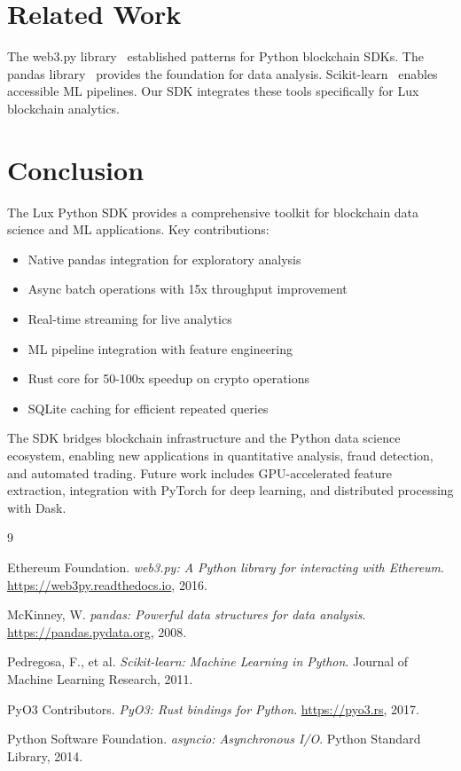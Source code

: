 \documentclass[11pt,twocolumn]{article}
\begin{document}
\section{Related Work}

The web3.py library~\cite{web3py} established patterns for Python blockchain SDKs. The pandas library~\cite{pandas} provides the foundation for data analysis. Scikit-learn~\cite{sklearn} enables accessible ML pipelines. Our SDK integrates these tools specifically for Lux blockchain analytics.

\section{Conclusion}

The Lux Python SDK provides a comprehensive toolkit for blockchain data science and ML applications. Key contributions:

\begin{itemize}
    \item Native pandas integration for exploratory analysis
    \item Async batch operations with 15x throughput improvement
    \item Real-time streaming for live analytics
    \item ML pipeline integration with feature engineering
    \item Rust core for 50-100x speedup on crypto operations
    \item SQLite caching for efficient repeated queries
\end{itemize}

The SDK bridges blockchain infrastructure and the Python data science ecosystem, enabling new applications in quantitative analysis, fraud detection, and automated trading. Future work includes GPU-accelerated feature extraction, integration with PyTorch for deep learning, and distributed processing with Dask.

\begin{thebibliography}{9}

Ethereum Foundation.
\textit{web3.py: A Python library for interacting with Ethereum}.
\url{https://web3py.readthedocs.io}, 2016.

McKinney, W.
\textit{pandas: Powerful data structures for data analysis}.
\url{https://pandas.pydata.org}, 2008.

Pedregosa, F., et al.
\textit{Scikit-learn: Machine Learning in Python}.
Journal of Machine Learning Research, 2011.

PyO3 Contributors.
\textit{PyO3: Rust bindings for Python}.
\url{https://pyo3.rs}, 2017.

Python Software Foundation.
\textit{asyncio: Asynchronous I/O}.
Python Standard Library, 2014.

\end{thebibliography}
\end{document}
